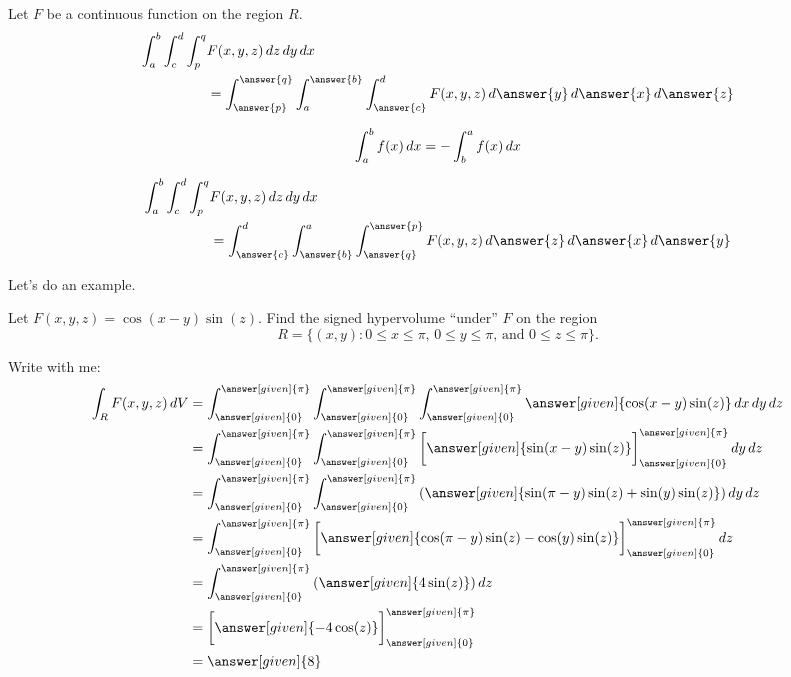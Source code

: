 \documentclass{ximera}
\begin{document}
\begin{question}
  Let $F$ be a continuous function on the region $R$.
  \begin{align*}
    \int_a^b\int_c^d\int_p^q &F(x,y,z)\d z \d y\d x \\
    &= \int_{\answer{p}}^{\answer{q}}\int_a^{\answer{b}}
    \int_{\answer{c}}^d F(x,y,z)\d \answer{y} \d \answer{x} \d \answer{z}
  \end{align*}
  \begin{question}
    \begin{hint}
      \[
      \int_a^b f(x) \mathop{}\!d x = - \int_b^a f(x) \mathop{}\!d x
      \]
    \end{hint}
    \begin{align*}
      \int_a^b\int_c^d\int_p^q &F(x,y,z)\d z \d y\d x \\
      &= \int_{\answer{c}}^{d}
    \int_{\answer{b}}^{a}\int_{\answer{q}}^{\answer{p}}
    F(x,y,z)\d \answer{z} \d \answer{x} \d \answer{y}
    \end{align*}
  \end{question}
\end{question}

Let's do an example.


\begin{example}
  Let $F(x,y,z) = \cos(x-y)\sin(z)$. Find the signed hypervolume ``under'' $F$ on the region
  \[
  R = \{(x,y):\text{$0\le x\le \pi$, $0\le y\le \pi$, and $0\le z\le \pi$}\}.
  \]
  \begin{explanation}
    Write with me:
    \begin{align*}
      \int_R F(x,y,z) \d V &=\int_{\answer[given]{0}}^{\answer[given]{\pi}}\int_{\answer[given]{0}}^{\answer[given]{\pi}}\int_{\answer[given]{0}}^{\answer[given]{\pi}} \answer[given]{\cos(x-y)\sin(z)} \d x \d y \d z \\
      &= \int_{\answer[given]{0}}^{\answer[given]{\pi}}\int_{\answer[given]{0}}^{\answer[given]{\pi}}\eval{\answer[given]{\sin(x-y)\sin(z)}}_{\answer[given]{0}}^{\answer[given]{\pi}}\d y \d z \\
      &= \int_{\answer[given]{0}}^{\answer[given]{\pi}}\int_{\answer[given]{0}}^{\answer[given]{\pi}}\left(\answer[given]{\sin(\pi-y)\sin(z) + \sin(y)\sin(z)}\right)\d y \d z \\
      &= \int_{\answer[given]{0}}^{\answer[given]{\pi}}\eval{\answer[given]{\cos(\pi-y)\sin(z) -\cos(y)\sin(z)}}_{\answer[given]{0}}^{\answer[given]{\pi}} \d z \\
      &= \int_{\answer[given]{0}}^{\answer[given]{\pi}}\left(\answer[given]{4\sin(z)}\right) \d z \\
      &= \eval{\answer[given]{-4\cos(z)}}_{\answer[given]{0}}^{\answer[given]{\pi}} \\
      &= \answer[given]{8}
    \end{align*}
  \end{explanation}
\end{example}
\end{document}
